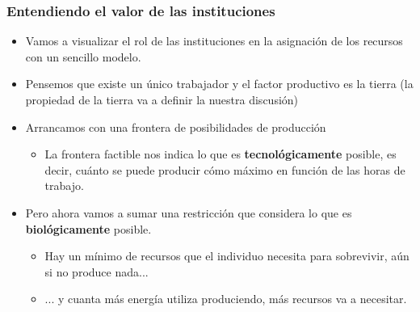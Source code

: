 \documentclass{beamer}
\begin{document}
\begin{frame}
\frametitle{Entendiendo el valor de las instituciones}
\begin{itemize}
    \item Vamos a visualizar el rol de las instituciones en la asignación de los recursos con un sencillo modelo. 
    \item Pensemos que existe un único trabajador y el factor productivo es la tierra (la propiedad de la tierra va a definir la nuestra discusión)
    \item Arrancamos con una frontera de posibilidades de producción 
        \begin{itemize}
        \item La frontera factible nos indica lo que es \textbf{tecnológicamente} posible, es decir, cuánto se puede producir cómo máximo en función de las horas de trabajo.
        \end{itemize}
    \item Pero ahora vamos a sumar una restricción que considera lo que es \textbf{biológicamente} posible.
        \begin{itemize} 
            \item Hay un mínimo de recursos que el individuo necesita para sobrevivir, aún si no produce nada...
            \item  ... y cuanta más energía utiliza produciendo, más recursos va a necesitar.
        \end{itemize}
    \end{itemize}
\end{frame}
\end{document}
